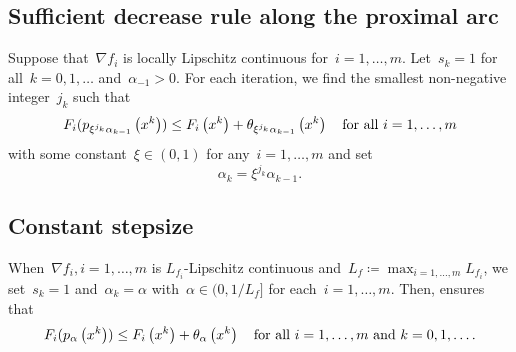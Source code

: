 \documentclass[../main]{subfiles}
\begin{document}
\subsection{Sufficient decrease rule along the proximal arc} 
Suppose that~$\nabla f_i$ is locally Lipschitz continuous for~$i = 1, \dots, m$.
Let~$s_k = 1$ for all~$k = 0, 1, \dots$ and~$\alpha_{-1} > 0$.
For each iteration, we find the smallest non-negative integer~$j_k$ such that
\begin{equation} \label{eq:pgm_sdc}
    F_i(p_{\xi^{j_k} \alpha_{k - 1}}\left(x^k\right)) \le F_i\left(x^k\right) + \theta_{\xi^{j_k} \alpha_{k - 1}}\left(x^k\right) \quad \text{for all~$i = 1, \dots, m$}
\end{equation} 
with some constant~$\xi \in (0, 1)$ for any~$i = 1, \dots, m$ and set
\begin{equation} \label{eq:pgm_sdc_step}
    \alpha_k = \xi^{j_k} \alpha_{k - 1}
.\end{equation}

\subsection{Constant stepsize} 
When~$\nabla f_i, i = 1, \dots, m$ is $L_{f_i}$-Lipschitz continuous and~$L_f \coloneqq \max_{i = 1, \dots, m} L_{f_i}$, we set~$s_k = 1$ and~$\alpha_k = \alpha$ with~$\alpha \in (0, 1 / L_f]$ for each~$i = 1, \dots, m$.
Then,  ensures that
\begin{equation} \label{eq:pgm_constant}
    F_i(p_\alpha\left(x^k\right)) \le F_i\left(x^k\right) + \theta_\alpha\left(x^k\right) \quad \text{for all~$i = 1, \dots, m \text{ and } k = 0, 1, \dots$}
.\end{equation} 
\end{document}
